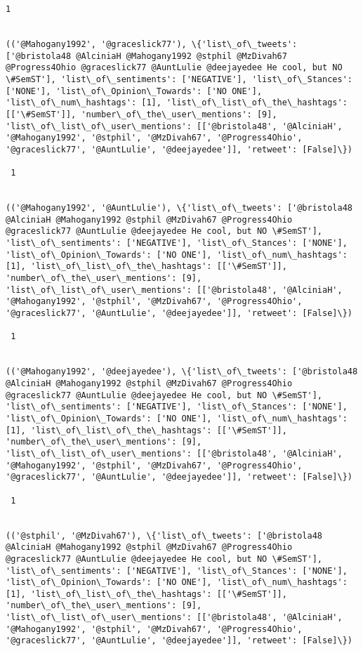 \documentclass[11pt]{article}
\begin{document}
\begin{Verbatim}[commandchars=\\\{\}]
 1
 

(('@Mahogany1992', '@graceslick77'), \{'list\_of\_tweets': ['@bristola48 @AlciniaH @Mahogany1992 @stphil @MzDivah67 @Progress4Ohio @graceslick77 @AuntLulie @deejayedee He cool, but NO \#SemST'], 'list\_of\_sentiments': ['NEGATIVE'], 'list\_of\_Stances': ['NONE'], 'list\_of\_Opinion\_Towards': ['NO ONE'], 'list\_of\_num\_hashtags': [1], 'list\_of\_list\_of\_the\_hashtags': [['\#SemST']], 'number\_of\_the\_user\_mentions': [9], 'list\_of\_list\_of\_user\_mentions': [['@bristola48', '@AlciniaH', '@Mahogany1992', '@stphil', '@MzDivah67', '@Progress4Ohio', '@graceslick77', '@AuntLulie', '@deejayedee']], 'retweet': [False]\})

 1
 

(('@Mahogany1992', '@AuntLulie'), \{'list\_of\_tweets': ['@bristola48 @AlciniaH @Mahogany1992 @stphil @MzDivah67 @Progress4Ohio @graceslick77 @AuntLulie @deejayedee He cool, but NO \#SemST'], 'list\_of\_sentiments': ['NEGATIVE'], 'list\_of\_Stances': ['NONE'], 'list\_of\_Opinion\_Towards': ['NO ONE'], 'list\_of\_num\_hashtags': [1], 'list\_of\_list\_of\_the\_hashtags': [['\#SemST']], 'number\_of\_the\_user\_mentions': [9], 'list\_of\_list\_of\_user\_mentions': [['@bristola48', '@AlciniaH', '@Mahogany1992', '@stphil', '@MzDivah67', '@Progress4Ohio', '@graceslick77', '@AuntLulie', '@deejayedee']], 'retweet': [False]\})

 1
 

(('@Mahogany1992', '@deejayedee'), \{'list\_of\_tweets': ['@bristola48 @AlciniaH @Mahogany1992 @stphil @MzDivah67 @Progress4Ohio @graceslick77 @AuntLulie @deejayedee He cool, but NO \#SemST'], 'list\_of\_sentiments': ['NEGATIVE'], 'list\_of\_Stances': ['NONE'], 'list\_of\_Opinion\_Towards': ['NO ONE'], 'list\_of\_num\_hashtags': [1], 'list\_of\_list\_of\_the\_hashtags': [['\#SemST']], 'number\_of\_the\_user\_mentions': [9], 'list\_of\_list\_of\_user\_mentions': [['@bristola48', '@AlciniaH', '@Mahogany1992', '@stphil', '@MzDivah67', '@Progress4Ohio', '@graceslick77', '@AuntLulie', '@deejayedee']], 'retweet': [False]\})

 1
 

(('@stphil', '@MzDivah67'), \{'list\_of\_tweets': ['@bristola48 @AlciniaH @Mahogany1992 @stphil @MzDivah67 @Progress4Ohio @graceslick77 @AuntLulie @deejayedee He cool, but NO \#SemST'], 'list\_of\_sentiments': ['NEGATIVE'], 'list\_of\_Stances': ['NONE'], 'list\_of\_Opinion\_Towards': ['NO ONE'], 'list\_of\_num\_hashtags': [1], 'list\_of\_list\_of\_the\_hashtags': [['\#SemST']], 'number\_of\_the\_user\_mentions': [9], 'list\_of\_list\_of\_user\_mentions': [['@bristola48', '@AlciniaH', '@Mahogany1992', '@stphil', '@MzDivah67', '@Progress4Ohio', '@graceslick77', '@AuntLulie', '@deejayedee']], 'retweet': [False]\})


\end{Verbatim}
\end{document}
